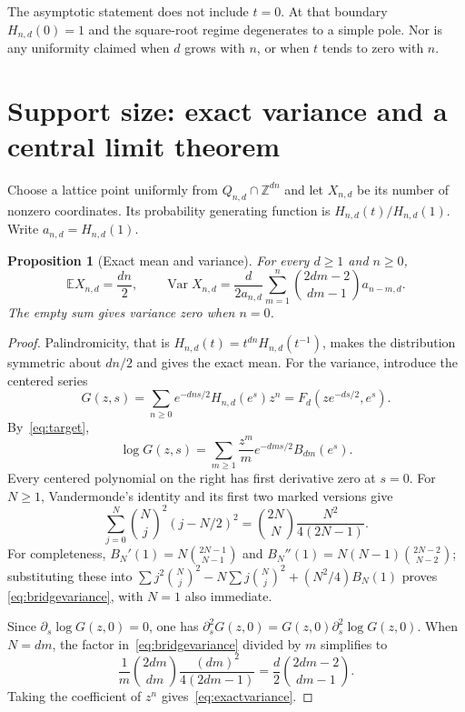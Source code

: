 \documentclass[11pt]{article}
\numberwithin{equation}{section}
\newtheorem{proposition}[theorem]{Proposition}
\theoremstyle{definition}
\newcommand{\Z}{\mathbb Z}
\newcommand{\Var}{\operatorname{Var}}
\newcommand{\E}{\mathbb E}
\begin{document}
The asymptotic statement does not include $t=0$. At that boundary
$H_{n,d}(0)=1$ and the square-root regime degenerates to a simple pole. Nor is
any uniformity claimed when $d$ grows with $n$, or when $t$ tends to zero with
$n$.

\section{Support size: exact variance and a central limit theorem}
\label{sec:statistics}

Choose a lattice point uniformly from $Q_{n,d}\cap\Z^{dn}$ and let $X_{n,d}$
be its number of nonzero coordinates. Its probability generating function is
$H_{n,d}(t)/H_{n,d}(1)$. Write $a_{n,d}=H_{n,d}(1)$.

\begin{proposition}[Exact mean and variance]
\label{prop:variance}
For every $d\geq1$ and $n\geq0$,
\begin{equation}
 \E X_{n,d}=\frac{dn}{2},\qquad
 \boxed{\Var X_{n,d}=\frac{d}{2a_{n,d}}
       \sum_{m=1}^n\binom{2dm-2}{dm-1}a_{n-m,d}.}
 \label{eq:exactvariance}
\end{equation}
The empty sum gives variance zero when $n=0$.
\end{proposition}
\begin{proof}
Palindromicity, that is $H_{n,d}(t)=t^{dn}H_{n,d}(t^{-1})$, makes the
distribution symmetric about $dn/2$ and gives the exact mean. For the
variance, introduce the centered series
\[
 G(z,s)=\sum_{n\geq0}e^{-dns/2}H_{n,d}(e^s)z^n
       =F_d(ze^{-ds/2},e^s).
\]
By~\eqref{eq:target},
\[
 \log G(z,s)=\sum_{m\geq1}\frac{z^m}{m}
                 e^{-dms/2}B_{dm}(e^s).
\]
Every centered polynomial on the right has first derivative zero at $s=0$.
For $N\geq1$, Vandermonde's identity and its first two marked versions give
\begin{equation}
 \sum_{j=0}^N\binom Nj^2(j-N/2)^2
 =\binom{2N}{N}\frac{N^2}{4(2N-1)}.
 \label{eq:bridgevariance}
\end{equation}
For completeness, $B_N'(1)=N\binom{2N-1}{N-1}$ and
$B_N''(1)=N(N-1)\binom{2N-2}{N-2}$; substituting these into
$\sum j^2\binom Nj^2-N\sum j\binom Nj^2+(N^2/4)B_N(1)$ proves
\eqref{eq:bridgevariance}, with $N=1$ also immediate.

Since $\partial_s\log G(z,0)=0$, one has
$\partial_s^2G(z,0)=G(z,0)\partial_s^2\log G(z,0)$.
When $N=dm$, the factor in~\eqref{eq:bridgevariance} divided by $m$ simplifies
to
\[
 \frac1m\binom{2dm}{dm}\frac{(dm)^2}{4(2dm-1)}
       =\frac d2\binom{2dm-2}{dm-1}.
\]
Taking the coefficient of $z^n$ gives~\eqref{eq:exactvariance}.
\end{proof}
\end{document}
